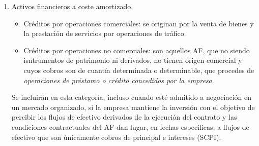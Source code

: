 \begin{enumerate}
    \item Activos financieros a coste amortizado.
    \begin{itemize}
        \item Créditos por operaciones comerciales: se originan por la venta de bienes y la prestación de servicios por operaciones de tráfico.
        \item Créditos por operaciones no comerciales: son aquellos AF, que no siendo isntrumentos de patrimonio ni derivados, no tienen origen comercial y cuyos cobros son de cuantía determinada o determinable, que procedes de \textit{operaciones de préstamo o crédito concedidos por la empresa}.
    \end{itemize}


    Se incluirán en esta categoría, incluso cuando esté admitido a negociación en un mercado organizado, si la empresa mantiene la inversión con el objetivo de percibir los flujos de efectivo derivados de la ejecución del contrato y las condiciones contractuales del AF dan lugar, en fechas específicas, a flujos de efectivo que son únicamente cobros de principal e intereses (SCPI).


\end{enumerate}
